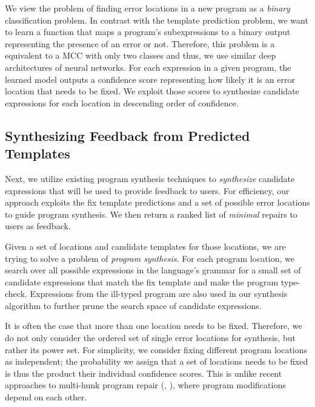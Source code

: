  We view the problem of finding error locations
in a new program as a \emph{binary} classification problem. In contrast with the
template prediction problem, we want to learn a function that maps a program's
subexpressions to a binary output representing the presence of an error or not.
Therefore, this problem is a equivalent to a MCC with only two classes and thus,
we use similar deep architectures of neural networks. For each expression in a
given program, the learned model outputs a confidence score representing how
likely it is an error location that needs to be fixed. We exploit those scores
to synthesize candidate expressions for each location in descending order of
confidence.

\subsection{Synthesizing Feedback from Predicted Templates}
\label{sec:overview:synthesis}

Next, we utilize existing program synthesis techniques to \emph{synthesize}
candidate expressions that will be used to provide feedback to users. For
efficiency, our approach exploits the fix template predictions and a set of
possible error locations to guide program synthesis. We then return a ranked
list of \emph{minimal} repairs to users as feedback.

 Given a set of locations and candidate templates for
those locations, we are trying to solve a problem of \emph{program synthesis}.
For each program location, we search over all possible
expressions in the language's grammar for a small set of candidate
expressions that match the fix template and make the program type-check.
Expressions from the ill-typed program are also used in our synthesis algorithm
to further prune the search space of candidate expressions.

It is often the case that more than one location needs to be fixed. Therefore,
we do not only consider the ordered set of single error locations for synthesis,
but rather its power set. For simplicity, we consider fixing different program
locations as independent; the probability we assign that a set of locations
needs to be fixed is thus the product their individual confidence scores. This
is unlike recent approaches to multi-hunk program repair (\eg,
\citep{Saha_2019}), where program modifications depend on each other.

